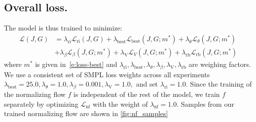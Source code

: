 \subsection{Overall loss.}

The model is thus trained to minimize:
\begin{equation}\label{e:loss-total}
  \begin{aligned}
    \mathcal{L}(J,G)&=
    \lambda_\text{ri} \mathcal{L}_\text{ri}(J,G) +
    \lambda_\text{best} \mathcal{L}_\text{best}(J,G;m^*) +
    \lambda_\theta \mathcal{L}_\theta(J,G;m^*) \\& +
    \lambda_\beta \mathcal{L}_\beta(J,G;m^*) +
    \lambda_\text{V} \mathcal{L}_V(J,G;m^*) +
    \lambda_\text{rb} \mathcal{L}_\text{rb}(J,G;m^*)
  \end{aligned}
\end{equation}
where $m^*$ is given in~\cref{e:loss-best} and
$
\lambda_\text{ri},
\lambda_\text{best},
\lambda_\theta,
\lambda_\beta,
\lambda_\text{V},
\lambda_\text{rb}
$
are weighing factors.
We use a consistent set of SMPL loss weights across all experiments
$\lambda_\text{best}= 25.0, \lambda_\theta=1.0,
\lambda_\beta=0.001,
\lambda_\text{V}=1.0,
$ and set $\lambda_\text{ri} = 1.0$.
%
Since the training of the normalizing flow $f$ is independent of the rest of the model, we train $f$ separately by optimizing $\mathcal{L}_\text{nf}$ with the weight of $\lambda_\text{nf}=1.0$. Samples from our trained normalizing flow are shown in \cref{fig:nf_samples}

